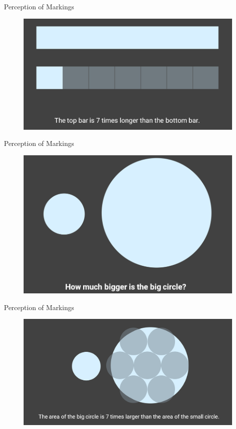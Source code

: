 \documentclass[aspectratio=169]{../latex_main/tntbeamer}  %
\begin{document}
	
	\begin{frame}{Perception of Markings}
	    \begin{figure}
	        \centering
	        \includegraphics[scale=.44]{Bild72}
	    \end{figure}
	\end{frame}
	
	
	\begin{frame}{Perception of Markings}
	    \begin{figure}
	        \centering
	        \includegraphics[scale=.42]{Bild73}
	    \end{figure}
	\end{frame}
	
	
	\begin{frame}{Perception of Markings}
	    \begin{figure}
	        \centering
	        \includegraphics[scale=.38]{Bild74}
	    \end{figure}
	\end{frame}
	
\end{document}
